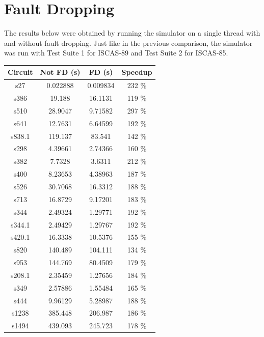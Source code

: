 \documentclass[a4paper,12pt]{article}
\begin{document}
\begin{center}
\begin{tabular}{||c c c c||}
\end{tabular}
\end{center}

\clearpage

\section*{Fault Dropping}

The results below were obtained by running the simulator on a single thread with and without fault dropping. Just like in the previous comparison, the simulator was run with Test Suite 1 for ISCAS-89 and Test Suite 2 for ISCAS-85.  


\begin{center}
\begin{tabular}{||c c c c||}
\hline
Circuit & Not FD (s) & FD (s) & Speedup \\ [0.5ex] 
\hline\hline
s27 & 0.022888 & 0.009834 & 232 \% \\ 
\hline
s386 & 19.188 & 16.1131 & 119 \% \\ 
\hline
s510 & 28.9047 & 9.71582 & 297 \% \\ 
\hline
s641 & 12.7631 & 6.64599 & 192 \% \\ 
\hline
s838.1 & 119.137 & 83.541 & 142 \% \\ 
\hline
s298 & 4.39661 & 2.74366 & 160 \% \\ 
\hline
s382 & 7.7328 & 3.6311 & 212 \% \\ 
\hline
s400 & 8.23653 & 4.38963 & 187 \% \\ 
\hline
s526 & 30.7068 & 16.3312 & 188 \% \\ 
\hline
s713 & 16.8729 & 9.17201 & 183 \% \\ 
\hline
s344 & 2.49324 & 1.29771 & 192 \% \\ 
\hline
s344.1 & 2.49429 & 1.29767 & 192 \% \\ 
\hline
s420.1 & 16.3338 & 10.5376 & 155 \% \\ 
\hline
s820 & 140.489 & 104.111 & 134 \% \\ 
\hline
s953 & 144.769 & 80.4509 & 179 \% \\ 
\hline
s208.1 & 2.35459 & 1.27656 & 184 \% \\ 
\hline
s349 & 2.57886 & 1.55484 & 165 \% \\ 
\hline
s444 & 9.96129 & 5.28987 & 188 \% \\ 
\hline
s1238 & 385.448 & 206.987 & 186 \% \\ 
\hline
s1494 & 439.093 & 245.723 & 178 \% \\ 

\end{tabular}
\end{center}
\end{document}
